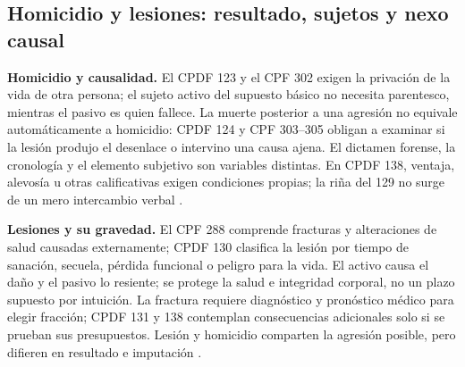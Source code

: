 \documentclass[spanish,letterpaper,oneside]{article}
\begin{document}
\subsection*{Homicidio y lesiones: resultado, sujetos y nexo causal}
\textbf{Homicidio y causalidad.} El CPDF 123 y el CPF 302 exigen la privación de la vida de otra persona; el sujeto activo del supuesto básico no necesita parentesco, mientras el pasivo es quien fallece. La muerte posterior a una agresión no equivale automáticamente a homicidio: CPDF 124 y CPF 303--305 obligan a examinar si la lesión produjo el desenlace o intervino una causa ajena. El dictamen forense, la cronología y el elemento subjetivo son variables distintas. En CPDF 138, ventaja, alevosía u otras calificativas exigen condiciones propias; la riña del 129 no surge de un mero intercambio verbal \citep{cpdfS3Consolidado,cpfOficial2026}.

\textbf{Lesiones y su gravedad.} El CPF 288 comprende fracturas y alteraciones de salud causadas externamente; CPDF 130 clasifica la lesión por tiempo de sanación, secuela, pérdida funcional o peligro para la vida. El activo causa el daño y el pasivo lo resiente; se protege la salud e integridad corporal, no un plazo supuesto por intuición. La fractura requiere diagnóstico y pronóstico médico para elegir fracción; CPDF 131 y 138 contemplan consecuencias adicionales solo si se prueban sus presupuestos. Lesión y homicidio comparten la agresión posible, pero difieren en resultado e imputación \citep{cpfOficial2026,cpdfS3Consolidado}.
\end{document}
